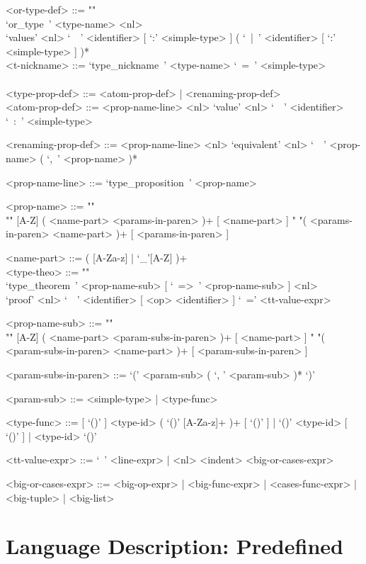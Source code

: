 \documentclass{article}
\begin{document}
\begin{grammar}
<or-type-def> ::= ""\\
`or_type\ ' <type-name> <nl> \\
`values' <nl> `\ \ ' <identifier> [ `:' <simple-type> ]
( `\ |\ ' <identifier> [ `:' <simple-type> ] )*
\\

<t-nickname> ::= `type_nickname\ ' <type-name> `\ =\ ' <simple-type>
\\\\

<type-prop-def> ::= <atom-prop-def> | <renaming-prop-def>
\\

<atom-prop-def> ::=
<prop-name-line> <nl> `value' <nl> `\ \ ' <identifier> `\ :\ ' <simple-type>

<renaming-prop-def> ::=
<prop-name-line> <nl> `equivalent' <nl> `\ \ ' <prop-name> ( `,\ ' <prop-name> )*

<prop-name-line> ::= `type_proposition\ ' <prop-name>

<prop-name> ::=  ""\\""
[A-Z] ( <name-part> <params-in-paren> )+ [ <name-part> ]
\alt " "( <params-in-paren> <name-part> )+ [ <params-in-paren> ]

<name-part> ::= ( [A-Za-z] | `_'[A-Z] )+
\\

<type-theo> ::= ""\\
`type_theorem\ ' <prop-name-sub> [ `\ =>\ ' <prop-name-sub> ] <nl> \\
`proof' <nl> `\ \ ' <identifier> [ <op> <identifier> ] `\ =' <tt-value-expr>

<prop-name-sub> ::=  ""\\""
[A-Z] ( <name-part> <param-subs-in-paren> )+ [ <name-part> ]
\alt " "( <param-subs-in-paren> <name-part> )+ [ <param-subs-in-paren> ]

<param-subs-in-paren> ::= `(' <param-sub> ( `, ' <param-sub> )* `)'

<param-sub> ::= <simple-type> | <type-func>

<type-func> ::=
[ `()' ] <type-id> ( `()' [A-Za-z]+ )+ [ `()' ] | `()' <type-id> [ `()' ] |
<type-id> `()'

<tt-value-expr> ::= `\ ' <line-expr> | <nl> <indent> <big-or-cases-expr>

<big-or-cases-expr> ::=
<big-op-expr> | <big-func-expr> | <cases-func-expr> | <big-tuple> | <big-list>
\end{grammar}

\section{Language Description: Predefined}
\end{document}
